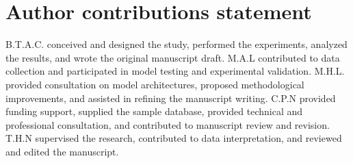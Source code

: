 \section*{Author contributions statement}
B.T.A.C. conceived and designed the study, performed the experiments, analyzed the results, and wrote the original manuscript draft. M.A.L contributed to data collection and participated in model testing and experimental validation. M.H.L. provided consultation on model architectures, proposed methodological improvements, and assisted in refining the manuscript writing. C.P.N provided funding support, supplied the sample database, provided technical and professional consultation, and contributed to manuscript review and revision. T.H.N supervised the research, contributed to data interpretation, and reviewed and edited the manuscript. 